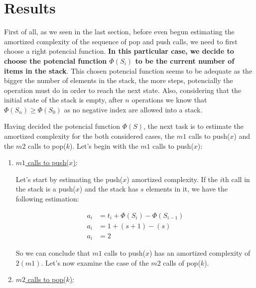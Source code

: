 \documentclass[12p]{report}
\begin{document}
 
  \section{Results}			%

First of all, as we seen in the last section, before even begun estimating the amortized complexity of the sequence of pop and push calls, we need to first choose a right potencial function. \textbf{In this particular case, we decide to choose the potencial function $\Phi(S_{i})$ to be the current number of items in the stack}. This chosen potencial function seems to be adequate as the bigger the number of elements in the stack, the more steps, potencially the operation must do in order to reach the next state. Also, considering that the initial state of the stack is empty, after $n$ operations we know that $\Phi(S_{n}) \geq \Phi(S_{0})$ as no negative index are allowed into a stack.

\bigskip

Having decided the potencial function $\Phi(S)$, the next task is to estimate the amortized complexity for the both considered cases, the $m1$ calls to push($x$) and the $m2$ calls to pop($k$). Let's begin with the $m1$ calls to push($x$):

\bigskip

\begin{enumerate}
\item \underline{$m1$ calls to push($x$)}:

Let's start by estimating the push($x$) amortized complexity. If the $i$th call in the stack is a push($x$) and the stack has $s$ elements in it, we have the following estimation:

\Large
\begin{align}
\nonumber
a_{i} &= t_{i} + \Phi(S_{i}) - \Phi(S_{i-1}) \\
\nonumber
a_{i} &= 1 + (s+1) - (s) \\
\nonumber
a_{i} &= 2
\end{align}

\large
So we can conclude that $m1$ calls to push($x$) has an amortized complexity of $2(m1)$. Let's now examine the case of the $m2$ calls of pop($k$).

\bigskip

\item \underline{$m2$ calls to pop($k$)}:
\end{enumerate}
\end{document}
